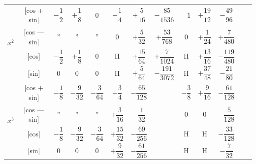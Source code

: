 \documentclass[11pt,a4paper]{book}
\begin{document}
\begin{center}
\begin{tabular}{|c|c|c|c|c|c|c|c|c|c|c|c|c|}
\hline
\multirow{4}{*}{$x^2$} & [cos + sin] & $-\dfrac{1}{2}$ & $+\dfrac{1}{8}$ & $0$ & $+\dfrac{1}{4}$ & $+\dfrac{5}{16}$ & $-\dfrac{85}{1536}$ & $-1$ & $+\dfrac{19}{12}$ & $-\dfrac{49}{96}$ \\
& [cos --- sin] & $"$ & $"$ & $"$ & $0$ & $+\dfrac{5}{32}$ & $+\dfrac{53}{768}$ & $0$ & $+\dfrac{1}{24}$ & $+\dfrac{7}{480}$ \\
& [cos] & $-\dfrac{1}{2}$ & $+\dfrac{1}{8}$ & $0$ & H & $+\dfrac{15}{64}$ & $+\dfrac{7}{1024}$ & H & $+\dfrac{13}{16}$ & $-\dfrac{119}{480}$ \\
& [sin] & $0$ & $0$ & $0$ & H & $+\dfrac{5}{64}$ & $-\dfrac{191}{3072}$ & H & $+\dfrac{37}{48}$ & $-\dfrac{21}{80}$ \\
\hline
\multirow{4}{*}{$x^3$} & [cos + sin] & $-\dfrac{1}{8}$ & $-\dfrac{9}{32}$ & $-\dfrac{3}{64}$ & $+\dfrac{3}{4}$ & $-\dfrac{65}{128}$ & & $-\dfrac{3}{8}$ & $+\dfrac{9}{16}$ & $-\dfrac{61}{128}$ \\
& [cos --- sin] & $"$ & $"$ & $"$ & $+\dfrac{3}{16}$ & $-\dfrac{1}{32}$ & & $0$ & $0$ & $-\dfrac{5}{128}$ \\
& [cos] & $-\dfrac{1}{8}$ & $-\dfrac{9}{32}$ & $-\dfrac{3}{64}$ & $+\dfrac{15}{32}$ & $-\dfrac{69}{256}$ & & H & H & $-\dfrac{33}{128}$ \\
& [sin] & $0$ & $0$ & $0$ & $+\dfrac{9}{32}$ & $-\dfrac{61}{256}$ & & H & H & $-\dfrac{7}{32}$ \\
\hline
\end{tabular}
\end{center}

\newpage
{}
\end{document}
